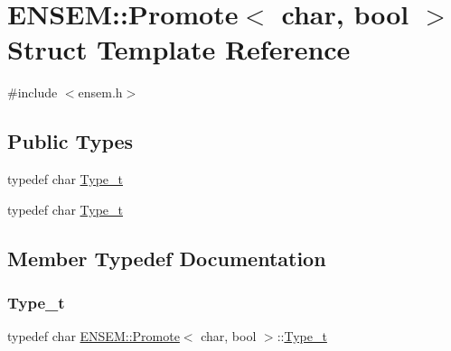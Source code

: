 \hypertarget{structENSEM_1_1Promote_3_01char_00_01bool_01_4}{}\section{E\+N\+S\+EM\+:\+:Promote$<$ char, bool $>$ Struct Template Reference}
\label{structENSEM_1_1Promote_3_01char_00_01bool_01_4}


{\ttfamily \#include $<$ensem.\+h$>$}

\subsection*{Public Types}
\begin{DoxyCompactItemize}
\item 
typedef char \mbox{\hyperlink{structENSEM_1_1Promote_3_01char_00_01bool_01_4_ad5b22f8f15e29245a56d9411fafedb3b}{Type\+\_\+t}}
\item 
typedef char \mbox{\hyperlink{structENSEM_1_1Promote_3_01char_00_01bool_01_4_ad5b22f8f15e29245a56d9411fafedb3b}{Type\+\_\+t}}
\end{DoxyCompactItemize}


\subsection{Member Typedef Documentation}
\mbox{\label{structENSEM_1_1Promote_3_01char_00_01bool_01_4_ad5b22f8f15e29245a56d9411fafedb3b}} 
\subsubsection{\texorpdfstring{Type\_t}{Type\_t}\hspace{0.1cm}{\footnotesize\ttfamily [1/2]}}
{\footnotesize\ttfamily typedef char \mbox{\hyperlink{structENSEM_1_1Promote}{E\+N\+S\+E\+M\+::\+Promote}}$<$ char, bool $>$\+::\mbox{\hyperlink{structENSEM_1_1Promote_3_01char_00_01bool_01_4_ad5b22f8f15e29245a56d9411fafedb3b}{Type\+\_\+t}}}

\mbox{\label{structENSEM_1_1Promote_3_01char_00_01bool_01_4_ad5b22f8f15e29245a56d9411fafedb3b}} 
